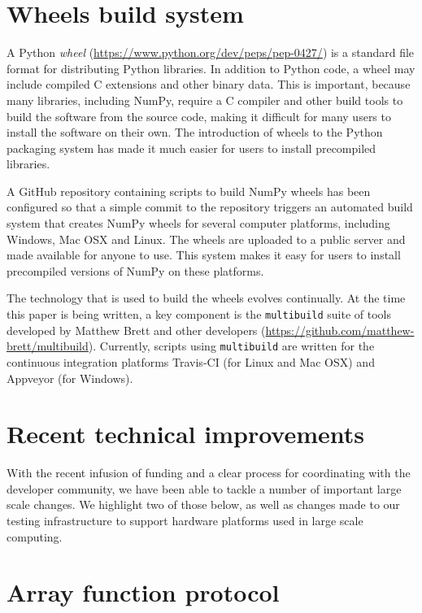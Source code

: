 \section*{Wheels build system}

A Python \emph{wheel} (\url{https://www.python.org/dev/peps/pep-0427/})
is a standard file format for distributing Python libraries.
In addition to Python code, a wheel may include compiled
C extensions and other binary data.
This is important, because many libraries, including NumPy,
require a C compiler and other build tools to build the software
from the source code, making it difficult for many users to install
the software on their own.  The introduction of wheels to the Python
packaging system has made it much easier for users to install
precompiled libraries.

A GitHub repository containing scripts to build NumPy wheels has
been configured so that a simple commit to the repository triggers
an automated build system that creates NumPy wheels for several
computer platforms, including Windows, Mac OSX and Linux.  The wheels
are uploaded to a public server and made available for anyone to use.
This system makes it easy for users to install precompiled versions
of NumPy on these platforms.

The technology that is used to build the wheels evolves continually.
At the time this paper is being written, a key component is the
\texttt{multibuild} suite of tools developed by Matthew Brett and
other developers (\url{https://github.com/matthew-brett/multibuild}).
Currently, scripts using \texttt{multibuild} are written for
the continuous integration platforms Travis-CI (for Linux and Mac OSX)
and Appveyor (for Windows).

\section*{Recent technical improvements}

With the recent infusion of funding and a clear process for coordinating with
the developer community, we have been able to tackle a number of important
large scale changes.
We highlight two of those below, as well as changes made to our testing
infrastructure to support hardware platforms used in large scale computing.

\section*{Array function protocol}

